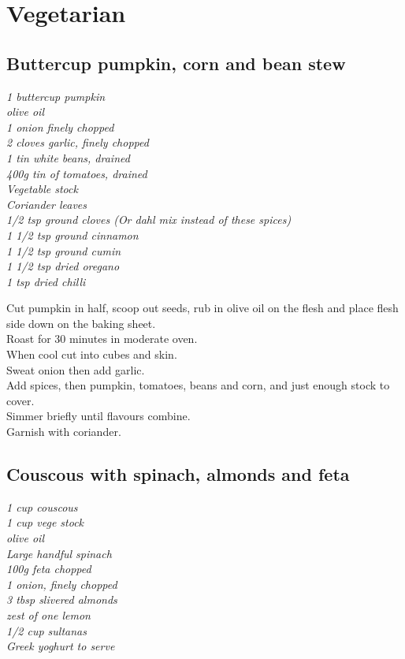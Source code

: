 \documentclass{tufte-book}
\begin{document}
\chapter{Vegetarian}

\section{Buttercup pumpkin, corn and bean stew}

\emph{1 buttercup pumpkin
\\olive oil
\\1 onion finely chopped
\\2 cloves garlic, finely chopped
\\1 tin white beans, drained
\\400g tin of tomatoes, drained
\\Vegetable stock
\\Coriander leaves 
\\1/2 tsp ground cloves  (Or dahl mix instead of these spices)
\\1 1/2 tsp ground cinnamon
\\1 1/2 tsp ground cumin
\\1 1/2 tsp dried oregano
\\1 tsp dried chilli
}

\smallskip
Cut pumpkin in half, scoop out seeds, rub in olive oil on the flesh and place flesh side down on the baking sheet.
\\Roast for 30 minutes in moderate oven.
\\When cool cut into cubes and skin.
\\Sweat onion then add garlic.
\\Add spices, then pumpkin, tomatoes, beans and corn, and just enough stock to cover.
\\Simmer briefly until flavours combine. 
\\Garnish with coriander.



\section{Couscous with spinach, almonds and feta}

\emph{1 cup couscous
\\1 cup vege stock
\\olive oil
\\Large handful spinach
\\100g feta chopped
\\1 onion, finely chopped
\\3 tbsp slivered almonds
\\zest of one lemon
\\1/2 cup sultanas
\\Greek yoghurt to serve
}
\end{document}
